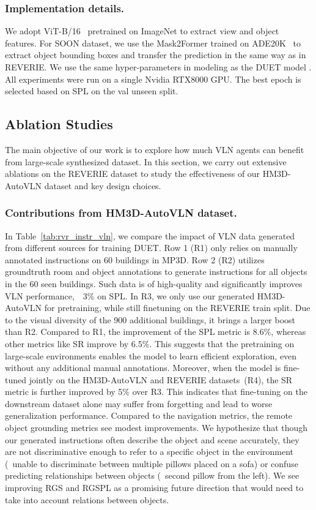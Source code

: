 \subsubsection{Implementation details.}
We adopt ViT-B/16~\cite{dosovitskiy2020image} pretrained on ImageNet to extract view and object features.
For SOON dataset, we use the Mask2Former trained on ADE20K~\cite{cheng2021mask2former} to extract object bounding boxes and transfer the prediction in the same way as in REVERIE.
We use the same hyper-parameters in modeling as the DUET model \cite{chen2022duet}.
All experiments were run on a single Nvidia RTX8000 GPU.
The best epoch is selected based on SPL on the val unseen split.

\subsection{Ablation Studies}
The main objective of our work is to explore how much VLN agents can benefit from large-scale synthesized dataset.
In this section, we carry out extensive ablations on the REVERIE dataset to study the effectiveness of our HM3D-AutoVLN dataset and key design choices.


\subsubsection{Contributions from HM3D-AutoVLN dataset.}
In Table~\ref{tab:rvr_instr_vln}, we compare the impact of VLN data generated from different sources for training DUET. 
Row 1 (R1) only relies on manually annotated instructions on 60 buildings in MP3D. Row 2 (R2) utilizes groundtruth room and object annotations to generate instructions for all objects in the 60 seen buildings. Such data is of high-quality and significantly improves VLN performance,~\eg~3\% on SPL.
In R3, we only use our generated HM3D-AutoVLN for pretraining, while still finetuning on the REVERIE train split.
Due to the visual diversity of the 900 additional buildings, it brings a larger boost than R2.
Compared to R1, the improvement of the SPL metric is 8.6\%, whereas other metrics like SR improve by 6.5\%.
This suggests that the pretraining on large-scale environments enables the model to learn efficient exploration, even without any additional manual annotations.
Moreover, when the model is fine-tuned jointly on the HM3D-AutoVLN and REVERIE datasets~(R4), the SR metric is further improved by 5\% over R3. This indicates that fine-tuning on the downstream dataset alone may suffer from forgetting and lead to worse generalization performance. 
Compared to the navigation metrics, the remote object grounding metrics see modest improvements.
We hypothesize that though our generated instructions often describe the object and scene accurately, they are not discriminative enough to refer to a specific object in the environment (\eg~unable to discriminate between multiple pillows placed on a sofa) or confuse predicting relationships between objects (\eg~second pillow from the left).
We see improving RGS and RGSPL as a promising future direction that would need to take into account relations between objects. 


